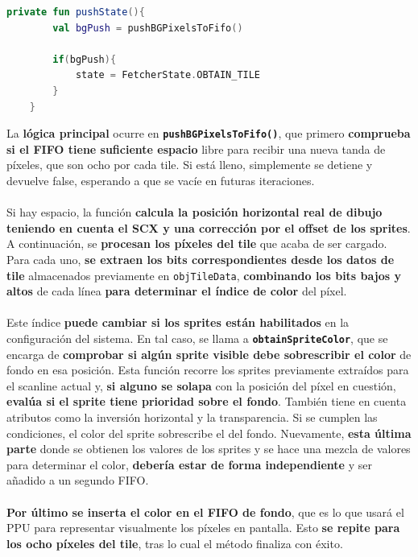 \begin{lstlisting}[language=Kotlin, caption={FIFO Fetcher - Push.}, label={code:ppufifopush}]
    private fun pushState(){
        val bgPush = pushBGPixelsToFifo()

        if(bgPush){
            state = FetcherState.OBTAIN_TILE
        }
    }
\end{lstlisting}

La \textbf{lógica principal} ocurre en \textbf{\texttt{pushBGPixelsToFifo()}}, que primero \textbf{comprueba si el FIFO tiene suficiente espacio} libre para recibir una nueva tanda de píxeles, que son ocho por cada tile. Si está lleno, simplemente se detiene y devuelve false, esperando a que se vacíe en futuras iteraciones.
\\\\
Si hay espacio, la función \textbf{calcula la posición horizontal real de dibujo teniendo en cuenta el SCX y una corrección por el offset de los sprites}. A continuación, se \textbf{procesan los píxeles del tile} que acaba de ser cargado. Para cada uno, \textbf{se extraen los bits correspondientes desde los datos de tile} almacenados previamente en \texttt{objTileData}, \textbf{combinando los bits bajos y altos} de cada línea \textbf{para determinar el índice de color} del píxel.
\\\\
Este índice \textbf{puede cambiar si los sprites están habilitados} en la configuración del sistema. En tal caso, se llama a \textbf{\texttt{obtainSpriteColor}}, que se encarga de \textbf{comprobar si algún sprite visible debe sobrescribir el color} de fondo en esa posición. Esta función recorre los sprites previamente extraídos para el scanline actual y, \textbf{si alguno se solapa} con la posición del píxel en cuestión, \textbf{evalúa si el sprite tiene prioridad sobre el fondo}. También tiene en cuenta atributos como la inversión horizontal y la transparencia. Si se cumplen las condiciones, el color del sprite sobrescribe el del fondo.
\clearpage
Nuevamente, \textbf{esta última parte} donde se obtienen los valores de los sprites y se hace una mezcla de valores para determinar el color, \textbf{debería estar de forma independiente} y ser añadido a un segundo FIFO.
\\\\
\textbf{Por último se inserta el color en el FIFO de fondo}, que es lo que usará el PPU para representar visualmente los píxeles en pantalla. Esto \textbf{se repite para los ocho píxeles del tile}, tras lo cual el método finaliza con éxito.

